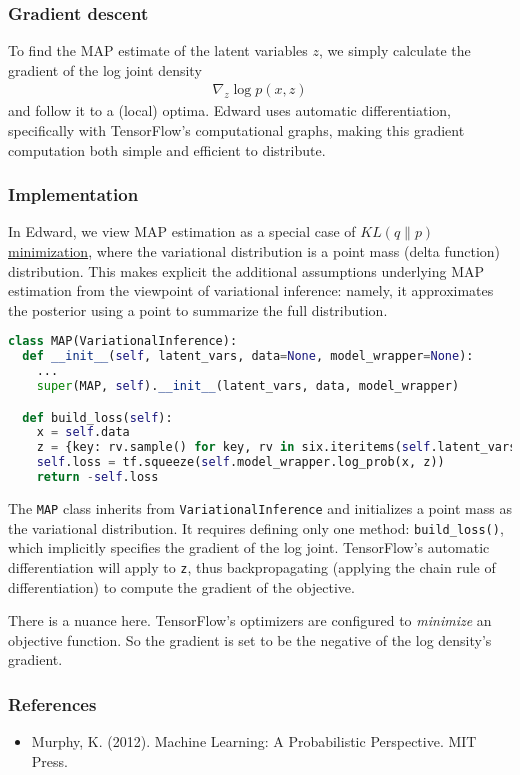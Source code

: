 \subsubsection{Gradient descent}

To find the MAP estimate of the latent variables $z$, we simply
calculate the gradient of the log joint density
\begin{align*}
  \nabla_z
  \log p(x, z)
\end{align*}
and follow it to a (local) optima.
Edward uses automatic differentiation, specifically with TensorFlow's
computational graphs, making this gradient computation both simple and
efficient to distribute.

\subsubsection{Implementation}

In Edward, we view MAP estimation as a special case of
\href{tut_KLqp}{$KL(q\|p)$ minimization}, where the variational
distribution is a point mass (delta function) distribution. This makes
explicit the additional assumptions underlying MAP estimation from the
viewpoint of variational inference: namely, it approximates the
posterior using a point to summarize the full distribution.

\begin{lstlisting}[language=Python]
class MAP(VariationalInference):
  def __init__(self, latent_vars, data=None, model_wrapper=None):
    ...
    super(MAP, self).__init__(latent_vars, data, model_wrapper)

  def build_loss(self):
    x = self.data
    z = {key: rv.sample() for key, rv in six.iteritems(self.latent_vars)}
    self.loss = tf.squeeze(self.model_wrapper.log_prob(x, z))
    return -self.loss
\end{lstlisting}

The \texttt{MAP} class inherits from \texttt{VariationalInference} and
initializes a point mass as the variational distribution. It requires
defining only one method:
\texttt{build_loss()}, which implicitly specifies the gradient of the
log joint. TensorFlow's automatic differentiation will apply to
\texttt {z}, thus backpropagating (applying the chain rule of
differentiation) to compute the gradient of the objective.

There is a nuance here. TensorFlow's optimizers are configured to
\emph{minimize} an objective function. So the gradient is set to be
the negative of the log density's gradient.

\subsubsection{References}\label{references}

\begin{itemize}
\item
  Murphy, K. (2012). Machine Learning: A Probabilistic Perspective. MIT Press.
\end{itemize}

